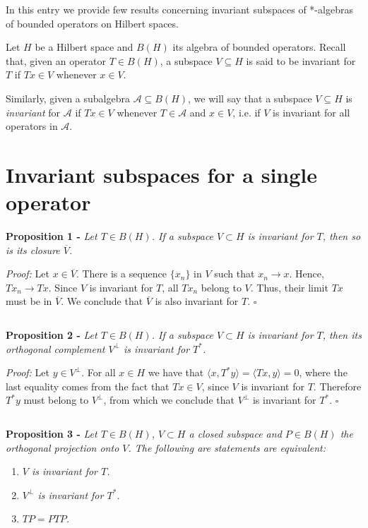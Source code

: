 \documentclass[12pt]{article}
\begin{document}

In this entry we provide few results concerning invariant subspaces of *-algebras of bounded operators on Hilbert spaces. 

Let $H$ be a Hilbert space and $B(H)$ its algebra of bounded operators. Recall that, given an operator $T \in B(H)$, a subspace $V \subseteq H$ is said to be invariant for $T$ if $T x \in V$ whenever $x \in V$.

Similarly, given a subalgebra $\mathcal{A} \subseteq B(H)$, we will say that a subspace $V \subseteq H$ is \emph{invariant} for $\mathcal{A}$ if $Tx \in V$ whenever $T \in \mathcal{A}$ and $x \in V$, i.e. if $V$ is invariant for all operators in $\mathcal{A}$.

\section*{Invariant subspaces for a single operator}

{\bf Proposition 1 -} \emph{Let $T \in B(H)$. If a subspace $V \subset H$ is invariant for $T$, then so is its closure $\overline{V}$.}

\emph{Proof:} Let $x \in \overline{V}$. There is a sequence $\{x_n\}$ in $V$ such that $x_n \to x$. Hence, $Tx_n \to Tx$. Since $V$ is invariant for $T$, all $Tx_n$ belong to $V$. Thus, their limit $Tx$ must be in $\overline{V}$. We conclude that $\overline{V}$ is also invariant for $T$. $\square$

$\,$

{\bf Proposition 2 -} \emph{Let $T \in B(H)$. If a subspace $V \subset H$ is invariant for $T$, then its orthogonal complement $V^{\perp}$ is invariant for $T^*$.}

\emph{Proof:} Let $y \in V^{\perp}$. For all $x \in H$ we have that $\langle x, T^*y \rangle = \langle Tx, y \rangle = 0$, where the last equality comes from the fact that $Tx \in V$, since $V$ is invariant for $T$. Therefore $T^*y$ must belong to $V^{\perp}$, from which we conclude that $V^{\perp}$ is invariant for $T^*$. $\square$

$\,$

{\bf Proposition 3 -} \emph{Let $T \in B(H)$, $V \subset H$ a closed subspace and $P \in B(H)$ the orthogonal projection onto $V$. The following are statements are equivalent:}
\begin{enumerate}
\item \emph{$V$ is invariant for $T$.}
\item \emph{$V^{\perp}$ is invariant for $T^*$.}
\item \emph{$TP = PTP$.}
\end{enumerate}
\end{document}
